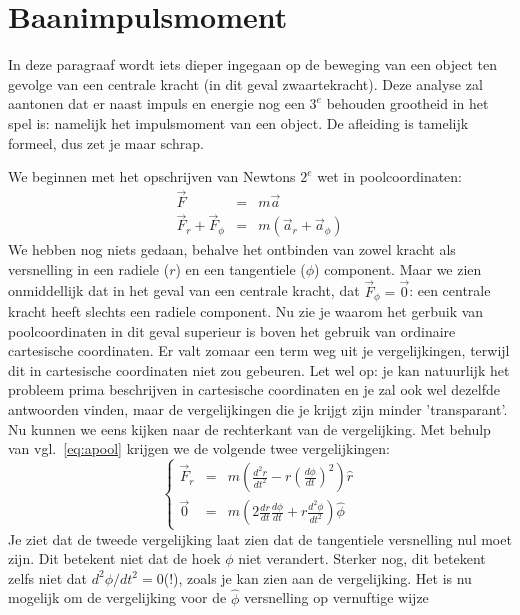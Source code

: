 \section{Baanimpulsmoment}

In deze paragraaf wordt iets dieper ingegaan op de beweging van een object ten gevolge van een centrale
kracht (in dit geval zwaartekracht). Deze analyse zal aantonen dat er naast impuls en energie nog een $3^e$
behouden grootheid in het spel is: namelijk het impulsmoment van een object. De afleiding is tamelijk
formeel, dus zet je maar schrap.

We beginnen met het opschrijven van Newtons $2^e$ wet in poolcoordinaten:
\begin{eqnarray}
\vec{F} & = & m\vec{a} \\
\vec{F}_r + \vec{F}_{\phi} & = & m\left(\vec{a}_{r} + \vec{a}_{\phi}\right)
\end{eqnarray}
We hebben nog niets gedaan, behalve het ontbinden van zowel kracht als versnelling in een radiele ($r$)
en een tangentiele ($\phi$) component.  Maar we zien onmiddellijk dat in het geval van een centrale 
kracht, dat $\vec{F}_{\phi}=\vec{0}$: een centrale kracht heeft slechts een radiele component. Nu zie je
waarom het gerbuik van poolcoordinaten in dit geval superieur is boven het gebruik van ordinaire cartesische
coordinaten.  Er valt zomaar een term weg uit je vergelijkingen, terwijl dit in cartesische coordinaten niet
zou gebeuren. Let wel op: je kan natuurlijk het probleem prima beschrijven in cartesische coordinaten en
je zal ook wel dezelfde antwoorden vinden, maar de vergelijkingen die je krijgt  zijn minder 'transparant'. 
Nu kunnen we eens kijken naar de rechterkant van de vergelijking. Met behulp van vgl.~\ref{eq:apool}
krijgen we de volgende twee vergelijkingen:
\begin{equation}
\left\{\begin{array}{ccc}
\vec{F}_r & = & m\left(\frac{d^2r}{dt^2} - r\left(\frac{d\phi}{dt}\right)^2\right)\hat{r} \\
\vec{0} & = & m\left(2 \frac{dr}{dt}\frac{d\phi}{dt}+r\frac{d^2\phi}{dt^2}\right)\hat{\phi}
\end{array}\right.
\end{equation}
Je ziet dat de tweede vergelijking laat zien dat de tangentiele versnelling nul moet zijn. Dit betekent niet dat
de hoek $\phi$ niet verandert. Sterker nog, dit betekent zelfs niet dat $d^2\phi / dt^2=0$(!), zoals je kan zien
aan de vergelijking. Het is nu mogelijk om de vergelijking voor de $\hat{\phi}$ versnelling op vernuftige wijze

